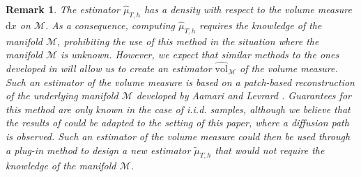 \documentclass[10pt,a4paper]{article}
\newcommand\cM{\mathcal{M}}
\newcommand\dd{\mathrm{d}}
\newtheorem{remark}[theorem]{Remark}
\begin{document}
\begin{remark}
    The estimator $\widehat{\mu}_{T,h}$ has a density with respect to the volume measure $\dd x$ on $\cM$. As a consequence,  computing $\widehat{\mu}_{T,h}$  requires the knowledge of the manifold $\cM$, prohibiting the use of this method in the situation where the manifold $\cM$ is unknown.  However, we expect that similar methods to  the ones developed in \cite{Divol2022} will allow us to create an estimator $\widehat{\mathrm{vol}}_{\cM}$ of the volume measure. Such an estimator of the volume measure is based on a patch-based reconstruction of the underlying manifold ${\cM}$ developed by Aamari and Levrard \cite{aamarilevrard2019}. Guarantees for this method are only known in the case of i.i.d. samples, although we believe that the results of \cite{aamarilevrard2019} could be adapted to the setting of this paper, where a diffusion path is observed. Such an estimator of the volume measure could then be used through a plug-in method to design a new estimator $\widetilde \mu_{T,h}$ that would not require the knowledge of the manifold $\cM$. 
\end{remark}
\end{document}
